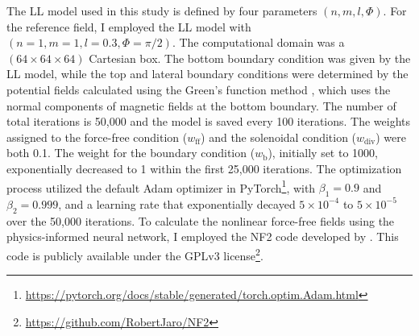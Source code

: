 The LL model used in this study is defined by four parameters $(n, m, l, \Phi)$. For the reference field, I employed the LL model with $(n=1, m=1, l=0.3, \Phi=\pi/2)$. The computational domain was a $(64\times64\times64)$ Cartesian box. The bottom boundary condition was given by the LL model, while the top and lateral boundary conditions were determined by the potential fields calculated using the Green's function method \parencite{sakurai1982green}, which uses the normal components of magnetic fields at the bottom boundary. The number of total iterations is 50,000 and the model is saved every 100 iterations. The weights assigned to the force-free condition ($w_{\text{ff}}$) and the solenoidal condition ($w_{\text{div}}$) were both 0.1. The weight for the boundary condition ($w_{\text{b}}$), initially set to 1000, exponentially decreased to 1 within the first 25,000 iterations. The optimization process utilized the default Adam optimizer in PyTorch\footnote{\url{https://pytorch.org/docs/stable/generated/torch.optim.Adam.html}}, with $\beta_1 = 0.9$ and $\beta_2 = 0.999$, and a learning rate that exponentially decayed $5\times10^{-4}$ to $5\times10^{-5}$ over the 50,000 iterations. To calculate the nonlinear force-free fields using the physics-informed neural network, I employed the NF2 code developed by \parencite{jarolim2022nf2}. This code is publicly available under the GPLv3 license\footnote{\url{https://github.com/RobertJaro/NF2}}.
